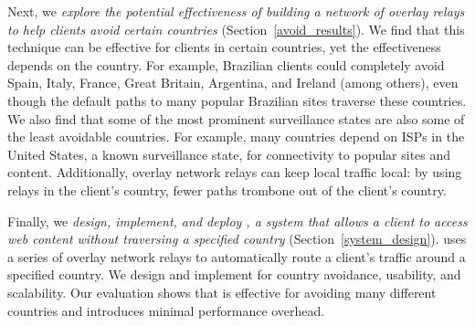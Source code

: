 Next, we {\em explore the
potential effectiveness of building a network of overlay relays to help
clients avoid certain countries}  (Section~\ref{avoid_results}).  
We find that this technique can be effective
for clients in certain countries, yet the effectiveness depends on the
country.  For example, Brazilian clients could completely avoid Spain,
Italy, France, Great Britain, Argentina, and Ireland (among others),
even though the default paths to many popular Brazilian sites traverse
these countries. We also find that some of the most prominent
surveillance states are also some of the least avoidable countries.  For
example, many countries depend on ISPs in the United States, a known
surveillance state, for connectivity to popular sites and content.
Additionally, overlay network relays can keep local traffic local: by
using relays in the client's country, fewer paths trombone out of the
client's country.

Finally, we {\em design, implement, and deploy \system{}, a system that allows
a client to access web content without traversing a specified country}
(Section~\ref{system_design}).  \system{} uses a series of overlay
network relays to automatically route a client's traffic around a
specified country.  We design and implement \system{} for country
avoidance, usability, and scalability.  Our evaluation shows that 
\system{} is effective for avoiding many different countries and
introduces minimal performance overhead.
